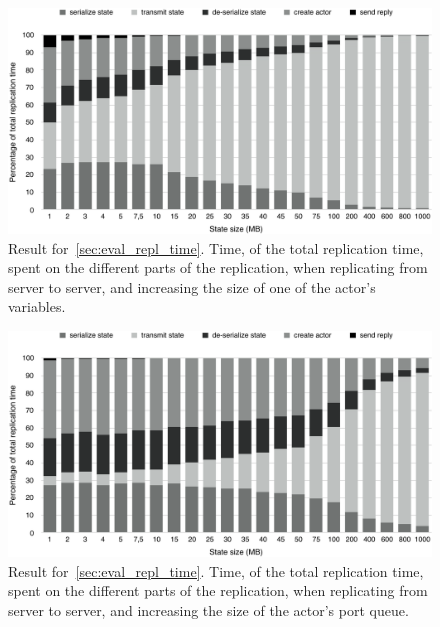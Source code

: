 \documentclass{cslthse-msc}
\begin{document}
\begin{figure}[hbt!]
\centering
\includegraphics[scale=0.5]{images/results/replication_time/server_parts_variable.pdf} 
\caption[Replication time parts in~\cref{sec:eval_repl_time}, server-server, increasing variable size]{Result for~\cref{sec:eval_repl_time}. Time, of the total replication time, spent on the different parts of the replication, when replicating from server to server, and increasing the size of one of the actor's variables.} \label{fig:replication_time_parts_server_variable}
\end{figure}

\begin{figure}[hbt!]
\centering
\includegraphics[scale=0.5]{images/results/replication_time/server_parts_queue.pdf} 
\caption[Replication time parts in~\cref{sec:eval_repl_time}, server-server, increasing queue size]{Result for~\cref{sec:eval_repl_time}. Time, of the total replication time, spent on the different parts of the replication, when replicating from server to server, and increasing the size of the actor's port queue.} \label{fig:replication_time_parts_server_queue}
\end{figure}
\end{document}

